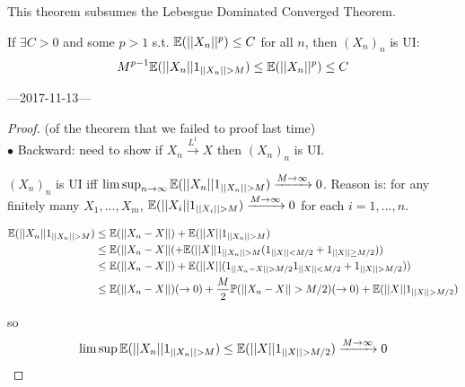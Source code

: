 \documentclass[a4paper]{article}
\begin{document}
\begin{rem}
This theorem subsumes the Lebesgue Dominated Converged Theorem.

If $\exists C>0$ and some $p>1$ s.t. $\mathbb{E}(||X_n||^p) \leq C$ for all $n$, then $(X_n)_n$ is UI:
\begin{equation*}
\begin{aligned}
M^{p-1}\E(||X_n||1_{||X_n||>M}) \leq \E(||X_n||^p) \leq C
\end{aligned}
\end{equation*}
\end{rem}

---2017-11-13---

\begin{proof} (of the theorem that we failed to proof last time)\\
$\bullet$ Backward: need to show if $X_n \xrightarrow{L^1} X$ then $(X_n)_n$ is UI.

\begin{rem}
$(X_n)_n$ is UI iff $\limsup_{n\to\infty} \E(||X_n||1_{||X_n||>M}) \xrightarrow{M\to\infty} 0$. Reason is: for any finitely many $X_1,...,X_m$, $\E(||X_i||1_{||X_i||>M}) \xrightarrow{M \to \infty} 0$ for each $i=1,...,n$.
\end{rem}

\begin{equation*}
\begin{aligned}
\E(||X_n|| 1_{||X_n||>M}) &\leq \E(||X_n-X||)+\E(||X||1_{||X_n||>M})\\
&\leq \E(||X_n-X||(+\E(||X||1_{||X_n||>M} (1_{||X||<M/2}+1_{||X||\geq M/2}))\\
&\leq \E(||X_n-X||)+\E(||X||(1_{||X_n-X||>M/2}1_{||X||<M/2}+1_{||X||>M/2}))\\
&\leq \E(||X_n-X||) (\to 0) + \frac{M}{2} \P(||X_n-X||>M/2) (\to 0) + \E(||X||1_{||X||>M/2})
\end{aligned}
\end{equation*}

so
\begin{equation*}
\begin{aligned}
\limsup \E(||X_n||1_{||X_n||>M}) \leq \E(||X||1_{||X||>M/2})\xrightarrow{M \to \infty} 0
\end{aligned}
\end{equation*}

\end{proof}
\end{document}
